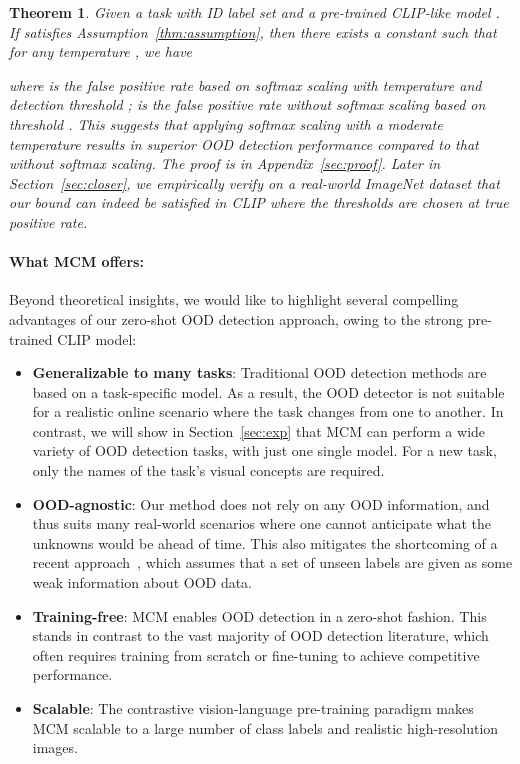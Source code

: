 \documentclass{article}
\newtheorem{theorem}{Theorem}[section]
\begin{document}
\begin{theorem}
\label{thm:main}
Given a task with ID label set  and a pre-trained CLIP-like model . If  satisfies Assumption~\ref{thm:assumption}, then there exists a constant  such that for any temperature ,
we have

where  is the false positive rate based on softmax scaling \emph{with} temperature  and detection threshold ;  is the false positive rate \emph{without} softmax scaling based on threshold . This suggests that applying softmax scaling with a moderate temperature results in superior OOD detection performance compared to that without softmax scaling. 
The proof is in Appendix~\ref{sec:proof}. Later in Section~\ref{sec:closer}, we empirically verify on a real-world ImageNet dataset that our bound can indeed be satisfied in CLIP where the thresholds are chosen at  true positive rate. 
\end{theorem}



\paragraph{What MCM offers:} Beyond theoretical insights, we would like to highlight several compelling advantages of our zero-shot OOD detection approach, owing to the strong pre-trained CLIP model:
\begin{itemize}[leftmargin=*,topsep=4pt,itemsep=4pt,parsep=0pt]
    \item \textbf{Generalizable to many tasks}: Traditional OOD detection methods are based on a task-specific model. As a result, the OOD detector is not suitable for a realistic online scenario where the task changes from one to another. In contrast, we will show in Section~\ref{sec:exp} that MCM can perform a wide variety of OOD detection tasks, with just one single model. For a new task, only the names of the task’s visual concepts  are required. 
    \item \textbf{OOD-agnostic}:  Our method does not rely on any OOD  information, and thus suits many real-world scenarios where one cannot anticipate what the unknowns would be ahead of time. This also mitigates the shortcoming of a recent  approach~\cite{fort2021exploring}, which assumes that a set of unseen labels are given as some weak information about OOD data.  
    \item \textbf{Training-free}: MCM enables OOD detection in a zero-shot fashion. This stands in contrast to the vast majority of OOD detection literature, which often requires training from scratch or fine-tuning to achieve competitive performance. 
    \item \textbf{Scalable}: The contrastive vision-language pre-training paradigm makes MCM scalable to a large number of class labels and realistic high-resolution images.
\end{itemize}
\end{document}
